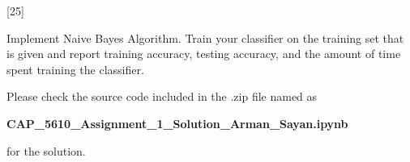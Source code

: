 \documentclass[12pt,letterpaper, onecolumn]{exam}
\begin{document}
\begin{questions}
\begin{parts}
  
    \end{parts}

    \pagebreak

    [25]

    Implement Naive Bayes Algorithm. Train your classifier on the training set that is given and report training accuracy, testing accuracy, and the amount of time spent training the classifier.

    \begin{solution}
        Please check the source code included in the .zip file named as

        \begin{center}
            \textbf{CAP\_5610\_Assignment\_1\_Solution\_Arman\_Sayan.ipynb}
        \end{center}
        
        for the solution.
    \end{solution}

    \pagebreak
    
\end{questions}
\end{document}
